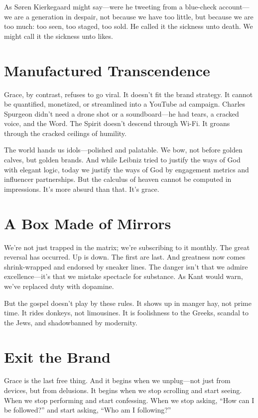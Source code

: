 \documentclass[a4paper,11pt]{book}
\begin{document}
As Søren Kierkegaard might say—were he tweeting from a blue-check account—we are a generation in despair, not because we have too little, but because we are too much: too seen, too staged, too sold. He called it the sickness unto death. We might call it the sickness unto likes.

\section{Manufactured Transcendence}

Grace, by contrast, refuses to go viral. It doesn’t fit the brand strategy. It cannot be quantified, monetized, or streamlined into a YouTube ad campaign. Charles Spurgeon didn’t need a drone shot or a soundboard—he had tears, a cracked voice, and the Word. The Spirit doesn’t descend through Wi-Fi. It groans through the cracked ceilings of humility.

The world hands us idols—polished and palatable. We bow, not before golden calves, but golden brands. And while Leibniz tried to justify the ways of God with elegant logic, today we justify the ways of God by engagement metrics and influencer partnerships. But the calculus of heaven cannot be computed in impressions. It’s more absurd than that. It’s grace.

\section{A Box Made of Mirrors}

We’re not just trapped in the matrix; we’re subscribing to it monthly. The great reversal has occurred. Up is down. The first are last. And greatness now comes shrink-wrapped and endorsed by sneaker lines. The danger isn’t that we admire excellence—it’s that we mistake spectacle for substance. As Kant would warn, we’ve replaced duty with dopamine.

But the gospel doesn’t play by these rules. It shows up in manger hay, not prime time. It rides donkeys, not limousines. It is foolishness to the Greeks, scandal to the Jews, and shadowbanned by modernity.

\section{Exit the Brand}

Grace is the last free thing. And it begins when we unplug—not just from devices, but from delusions. It begins when we stop scrolling and start seeing. When we stop performing and start confessing. When we stop asking, “How can I be followed?” and start asking, “Who am I following?”
\end{document}
